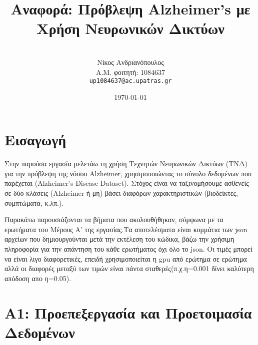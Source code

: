 \documentclass[a4paper,11pt]{article}
\begin{document}

\title{\textbf{Αναφορά: Πρόβλεψη Alzheimer’s με Χρήση Νευρωνικών Δικτύων}}
\author{\\
\large Νίκος Ανδριανόπουλος \\
\large Α.Μ. φοιτητή: 1084637 \\
\large \texttt{up1084637@ac.upatras.gr}
}
\date{\today}
\maketitle

\tableofcontents
\section{Εισαγωγή}
Στην παρούσα εργασία μελετάω τη χρήση Τεχνητών Νευρωνικών Δικτύων (ΤΝΔ) για την
πρόβλεψη της νόσου Alzheimer, χρησιμοποιώντας το σύνολο δεδομένων που παρέχεται
(Alzheimer’s Disease Dataset). Στόχος είναι να ταξινομήσουμε ασθενείς σε δύο κλάσεις
(Alzheimer ή μη) βάσει διαφόρων χαρακτηριστικών (βιοδείκτες, συμπτώματα, κ.λπ.).

Παρακάτω παρουσιάζονται τα βήματα που ακολουθήθηκαν, σύμφωνα με τα ερωτήματα του
Μέρους Α’ της εργασίας.Τα αποτελέσματα είναι κομμάτια των json αρχείων που δημιουργούνται μετά
την εκτέλεση του κώδικα, βάζω την χρήσιμη πληροφορία για την απάντηση του κάθε ερωτήματος όχι όλο το json.
Οι τιμές μπορεί να είναι λιγο διαφορετικές, επειδή χρησιμοποιείται η gpu από ερώτημα σε ερώτημα αλλά οι διαφορές 
μεταξύ των τιμών είναι πάντα σταθερές(π.χ.η=0.001 δίνει καλύτερη απόδοση απο η=0.05).
\section{A1: Προεπεξεργασία και Προετοιμασία Δεδομένων}
\end{document}
